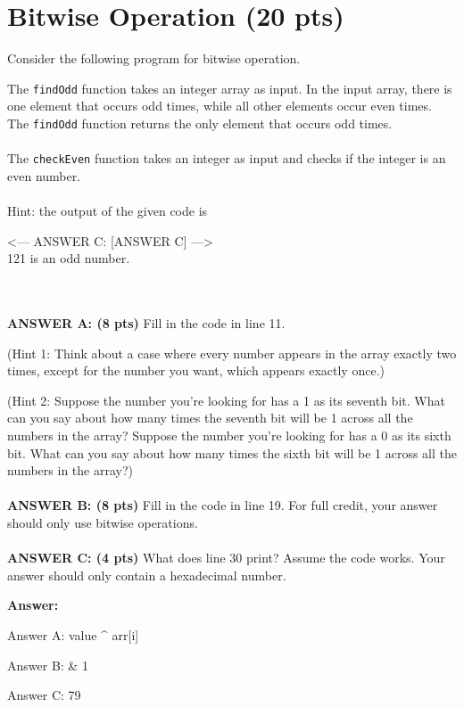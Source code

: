 \newpage
\section{Bitwise Operation (20 pts)} 

Consider the following program for bitwise operation.

\resetlinenumber[1]
\linenumbers
\begin{tt}
	
\end{tt}
\nolinenumbers

The {\tt findOdd} function takes an integer array as input. In the input array, there is one element that occurs odd times, while all other elements occur even times. The {\tt findOdd} function returns the only element that occurs odd times.
\\
~\\
The {\tt checkEven} function takes an integer as input and checks if the integer is an even number.
\\
~\\
Hint: the output of the given code is

\begin{tt}
<--- ANSWER C: [ANSWER C] --->\\
121 is an odd number.
\end{tt}
\\
~\\
{\bf ANSWER A: (8 pts)} Fill in the code in line 11. 

(Hint 1: Think about a case where every number appears in the array exactly two times, except for the number you want, which appears exactly once.)

(Hint 2: Suppose the number you're looking for has a 1 as its seventh bit. What can you say about how many times the seventh bit will be 1 across all the numbers in the array? Suppose the number you're looking for has a 0 as its sixth bit. What can you say about how many times the sixth bit will be 1 across all the numbers in the array?)
\\
~\\
{\bf ANSWER B: (8 pts)} Fill in the code in line 19. For full credit, your answer should only use bitwise operations.
\\
~\\
{\bf ANSWER C: (4 pts)} What does line 30 print? Assume the code works. Your answer should only contain a hexadecimal number.

\ifexam


\else


{\bf Answer:}

Answer A: value \^{} arr[i]

Answer B: \& 1

Answer C: 79

\fi
